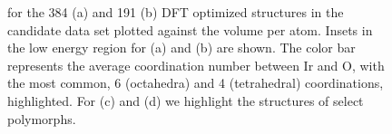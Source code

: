 \begin{figure}[!htb]
\centering
{}
\caption{\label{fig:E_vs_V}
%
\DHf for the \num{384} \IrOtwo (a) and \num{191} \IrOthree (b) DFT optimized structures in the candidate data set plotted against the volume per atom.
%
Insets in the low energy region for (a) and (b) are shown.
%
The color bar represents the average coordination number between Ir and O, with the most common, 6 (octahedra) and 4 (tetrahedral) coordinations, highlighted.
%
For \IrOtwo (c) and \IrOthree (d) we highlight the structures of select polymorphs.
}
\end{figure}


